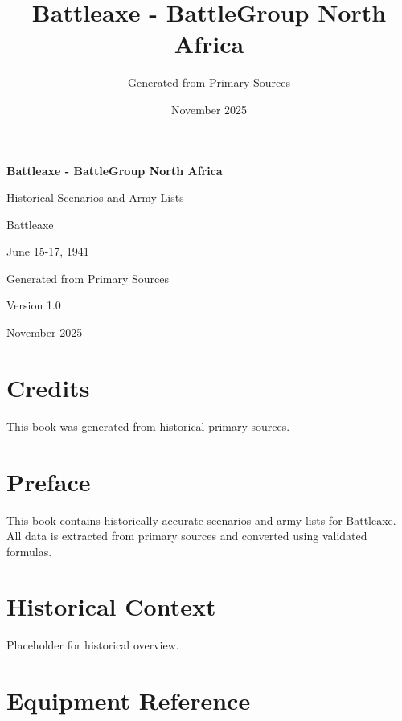 \documentclass[11pt,letterpaper,twoside]{book}
\title{Battleaxe - BattleGroup North Africa}
\author{Generated from Primary Sources}
\date{November 2025}
\begin{document}
\begin{titlepage}
  \centering
  \vspace*{2cm}

  {\Huge\bfseries Battleaxe - BattleGroup North Africa\par}
  \vspace{0.5cm}
  {\Large Historical Scenarios and Army Lists\par}
  \vspace{2cm}

  {\large Battleaxe\par}
  {\large June 15-17, 1941\par}
  \vspace{1cm}

  \vfill

  {\large Generated from Primary Sources\par}
  {\large Version 1.0\par}
  {\large November 2025\par}
\end{titlepage}

\chapter*{Credits}

This book was generated from historical primary sources.

\tableofcontents
\clearpage

\chapter*{Preface}

This book contains historically accurate scenarios and army lists for Battleaxe.
All data is extracted from primary sources and converted using validated formulas.

\chapter{Historical Context}

Placeholder for historical overview.

\chapter{Equipment Reference}
\end{document}
